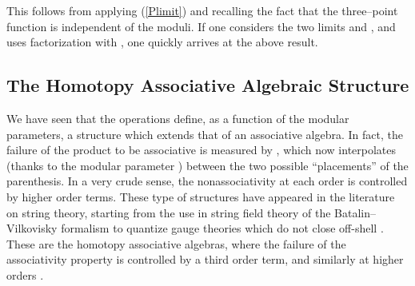 \documentclass[a4paper,11pt]{article}
\begin{document}
\noindent
This follows from applying (\ref{Plimit}) and recalling the fact that the
three--point function \coordHE{} is independent of the moduli. If one considers
the two limits \coordHE{} and \coordHE{}, and uses factorization with \coordHE{}, one quickly
arrives at the above result.


\subsection{The Homotopy Associative Algebraic Structure}


We have seen that the operations \coordHE{} define, as a function of the modular
parameters, a structure which extends that of an associative algebra. In
fact, the failure of the product \coordHE{} to be associative is
measured by \coordHE{}, which now interpolates (thanks to the modular parameter
\coordHE{}) between the two possible ``placements'' of the parenthesis. In
a very crude sense, the nonassociativity at each order is controlled by
higher order terms. These type of structures have appeared in the
literature on string theory, starting from the use in string field theory
of the Batalin--Vilkovisky formalism to quantize gauge theories which do
not close off-shell \cite{Lada-Stasheff, Lada-Markl, Zwiebach, GAB}. These 
are the \coordHE{} homotopy associative algebras, where the failure of 
the associativity property is controlled by a third order term, and similarly  
at higher orders \cite{Stasheff}.
\end{document}
